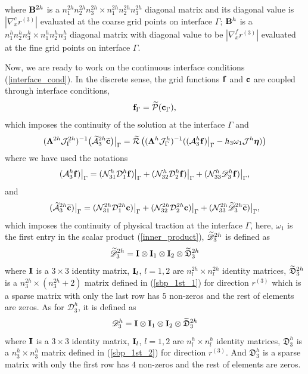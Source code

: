 where ${\bf B}^{2h}$ is a $n_1^{2h}n_2^{2h}n_3^{2h}\times n_1^{2h}n_2^{2h}n_3^{2h}$ diagonal matrix and its diagonal value is $|\nabla_x^c r^{(3)}|$ evaluated at the coarse grid points on interface $\Gamma$; ${\bf B}^{h}$ is a $n_1^{h}n_2^{h}n_3^{h}\times n_1^{h}n_2^{h}n_3^{h}$ diagonal matrix with diagonal value to be  $|\nabla_x^f r^{(3)}|$ evaluated at the fine grid points on interface $\Gamma$.


Now, we are ready to  work on the continuous interface conditions (\ref{interface_cond}). In the discrete sense,  the grid functions ${\bf f}$ and ${\bf c}$ are coupled through interface conditions,
\begin{equation}\label{continuous_sol}
{\bf f}_{\Gamma} = \wt{\mathcal{P}}({\bf c}_{\Gamma}),
\end{equation}
which imposes the continuity of the solution at the interface $\Gamma$
and
\begin{equation}\label{continuous_traction}
(\bm{\Lambda}^{2h}{\mathcal J}_{\Gamma}^{2h})^{-1}\big(\wt{\mathcal{A}}_3^{2h}\wt{\bf c}\big)\big|_\Gamma
= \wt{\mathcal{R}}\left((\bm{\Lambda}^{h}{\mathcal J}^h_{\Gamma})^{-1}((\mathcal{A}_3^h{\bf f})\big|_\Gamma-h_3\omega_1{\mathcal J}^h{\bm \eta})\right)
\end{equation}
where we have used the notations
\begin{equation}\label{hatAf}
(\mathcal{A}_3^h{\bf f})\big|_\Gamma = (\mathcal{N}_{31}^{h}\mathcal{D}^h_1{\bf f})\big|_\Gamma + (\mathcal{N}_{32}^h\mathcal{D}^h_2{\bf f})\big|_\Gamma + (\mathcal{N}_{33}^h\mathscr{D}_3^h{\bf f})\big|_\Gamma,
\end{equation}
and
\begin{equation}\label{hatAc}
(\wt{\mathcal{A}}_3^{2h}\wt{\bf c})\big|_\Gamma = (\mathcal{N}_{31}^{2h}\mathcal{D}^{2h}_1{\bf c})\big|_\Gamma + (\mathcal{N}_{32}^{2h}\mathcal{D}^{2h}_2{\bf c})\big|_\Gamma + (\mathcal{N}_{33}^{2h}\wt{\mathscr D}^{2h}_3\wt{\bf c})\big|_\Gamma,
\end{equation}
which imposes the continuity of physical traction at the interface $\Gamma$, here, $\omega_1$ is the first entry in the scalar product (\ref{inner_product}), $\widetilde{\mathscr{D}}_3^{2h}$ is defined as
\[\widetilde{\mathscr{D}}_3^{2h} = {\bf I}\otimes {\bf I}_1 \otimes {\bf I}_2 \otimes \widetilde{\mathfrak{D}}_3^{2h}\]
where ${\bf I}$ is a $3\times3$ identity matrix, ${\bf I}_l$, $l = 1,2$ are $n_l^{2h}\times n_l^{2h}$ identity matrices, $\widetilde{\mathfrak{D}}_3^{2h}$ is a $n_3^{2h}\times (n_3^{2h}+2)$ matrix defined in (\ref{sbp_1st_1}) for direction $r^{(3)}$ which is a sparse matrix with only the last row has $5$ non-zeros and the rest of elements are zeros. As for $\mathscr{D}_3^{h}$, it is defined as
\[\mathscr{D}_3^{h} = {\bf I}\otimes {\bf I}_1 \otimes {\bf I}_2 \otimes \widetilde{\mathfrak{D}}_3^{2h}\]
where ${\bf I}$ is a $3\times3$ identity matrix, ${\bf I}_l$, $l = 1,2$ are $n_l^{h}\times n_l^{h}$ identity matrices, $\mathfrak{D}_3^{h}$ is a $n_3^{h}\times n_3^{h}$ matrix defined in (\ref{sbp_1st_2}) for direction $r^{(3)}$. And $\mathfrak{D}_3^{h}$ is a sparse matrix with only the first row has $4$ non-zeros and the rest of elements are zeros. 


